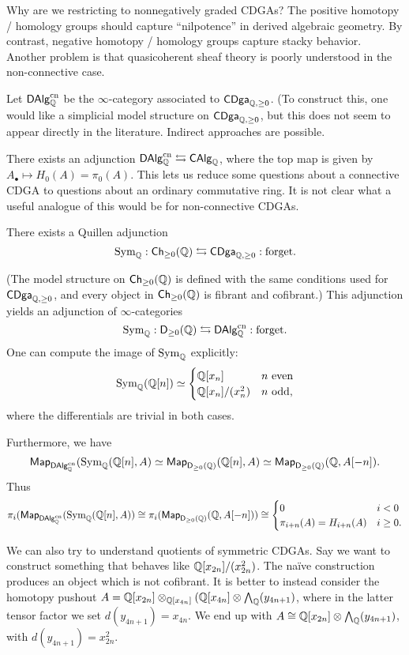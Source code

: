 \documentclass{amsart}
\begin{document}
Why are we restricting to nonnegatively graded CDGAs?
The positive homotopy / homology groups should capture ``nilpotence'' in derived algebraic geometry.
By contrast, negative homotopy / homology groups capture stacky behavior.
Another problem is that quasicoherent sheaf theory is poorly understood in the non-connective case.

\begin{dfn}
	Let $\mathsf{DAlg}_{\mathbb{Q}}^{\mathrm{cn}}$ be the $\infty$-category associated to $\mathsf{CDga}_{\mathbb{Q}, \geq 0}$.
	(To construct this, one would like a simplicial model structure on $\mathsf{CDga}_{\mathbb{Q}, \geq 0}$, but this does not seem to appear directly in the literature.
	Indirect approaches are possible.
\end{dfn}

There exists an adjunction $\mathsf{DAlg}_{\mathbb{Q}}^{\mathrm{cn}} \leftrightarrows \mathsf{CAlg}_{\mathbb{Q}}$, where the top map is given by $A_\bullet \mapsto H_0(A) = \pi_0(A)$.
This lets us reduce some questions about a connective CDGA to questions about an ordinary commutative ring.
It is not clear what a useful analogue of this would be for non-connective CDGAs.

\begin{ex}
	There exists a Quillen adjunction 
	\[
		\operatorname{Sym}_{\mathbb{Q}}: \mathsf{Ch}_{\geq 0}(\mathbb{Q}) \leftrightarrows \mathsf{CDga}_{\mathbb{Q}, \geq 0}: \textrm{forget}.
	\]

	(The model structure on $\mathsf{Ch}_{\geq 0}(\mathbb{Q})$ is defined with the same conditions used for $\mathsf{CDga}_{\mathbb{Q}, \geq 0}$, and every object in $\mathsf{Ch}_{\geq 0}(\mathbb{Q})$ is fibrant and cofibrant.)
	This adjunction yields an adjunction of $\infty$-categories 
	\[
		\operatorname{Sym}_{\mathbb{Q}}: \mathsf{D}_{\geq 0}(\mathbb{Q}) \leftrightarrows \mathsf{DAlg}_{\mathbb{Q}}^{\mathrm{cn}}: \textrm{forget}.
	\]
	One can compute the image of $\operatorname{Sym}_{\mathbb{Q}}$ explicitly:
	\[
		\operatorname{Sym}_{\mathbb{Q}}(\mathbb{Q}[n]) \simeq 
		\begin{cases}
			\mathbb{Q}[x_n] & n \textrm{ even} \\
			\mathbb{Q}[x_n] / (x_n^2) & n \textrm{ odd,}
		\end{cases}
	\]
	where the differentials are trivial in both cases.

	Furthermore, we have
	\[
		\mathsf{Map}_{\mathsf{DAlg}_{\mathbb{Q}}^{\mathrm{cn}}}(\operatorname{Sym}_{\mathbb{Q}}(\mathbb{Q}[n], A) \simeq \mathsf{Map}_{\mathsf{D}_{\geq 0}(\mathbb{Q})}(\mathbb{Q}[n], A) \simeq \mathsf{Map}_{\mathsf{D}_{\geq 0}(\mathbb{Q})}(\mathbb{Q}, A[-n]).
	\]
	Thus
	\[
		\pi_i(\mathsf{Map}_{\mathsf{DAlg}_{\mathbb{Q}}^{\mathrm{cn}}}(\operatorname{Sym}_{\mathbb{Q}}(\mathbb{Q}[n], A)) \cong \pi_i(\mathsf{Map}_{\mathsf{D}_{\geq 0}(\mathbb{Q})}(\mathbb{Q}, A[-n])) \cong
		\begin{cases}
			0 & i < 0 \\
			\pi_{i+n}(A) = H_{i+n}(A) & i \geq 0.
		\end{cases}
	\]
\end{ex}

\begin{ex}
	We can also try to understand quotients of symmetric CDGAs.
	Say we want to construct something that behaves like $\mathbb{Q}[x_{2n}] / (x_{2n}^2)$.
	The na\"ive construction produces an object which is not cofibrant.
	It is better to instead consider the homotopy pushout $A = \mathbb{Q}[x_{2n}] \otimes_{\mathbb{Q}[x_{4n}]} (\mathbb{Q}[x_{4n}] \otimes \bigwedge_{\mathbb{Q}} (y_{4n+1})$, where in the latter tensor factor we set $d(y_{4n+1}) = x_{4n}$.
	We end up with $A \cong \mathbb{Q}[x_{2n}] \otimes \bigwedge_{\mathbb{Q}}(y_{4n+1})$, with $d(y_{4n+1}) = x_{2n}^2$.
\end{ex}
\end{document}
